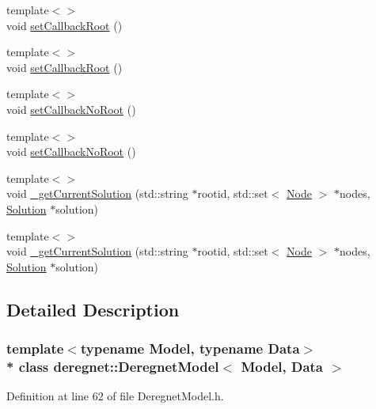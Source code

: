 \begin{DoxyCompactItemize}
\item 
{\footnotesize template$<$$>$ }\\void \hyperlink{classderegnet_1_1DeregnetModel_a8f10c7fabb80842cd27eb10d31289bbb}{set\+Callback\+Root} ()
\item 
{\footnotesize template$<$$>$ }\\void \hyperlink{classderegnet_1_1DeregnetModel_a1d62ef7fd28d6316d549712bf9214e54}{set\+Callback\+Root} ()
\item 
{\footnotesize template$<$$>$ }\\void \hyperlink{classderegnet_1_1DeregnetModel_a2aacf97af86f2c0f62b9fe4857443400}{set\+Callback\+No\+Root} ()
\item 
{\footnotesize template$<$$>$ }\\void \hyperlink{classderegnet_1_1DeregnetModel_a53356bbd16a9a2bfb51fcdf35da9cc7a}{set\+Callback\+No\+Root} ()
\item 
{\footnotesize template$<$$>$ }\\void \hyperlink{classderegnet_1_1DeregnetModel_ae031344d7bef7965ecbff1af301cc32b}{\+\_\+get\+Current\+Solution} (std\+::string $\ast$rootid, std\+::set$<$ \hyperlink{namespacederegnet_a744bad34f2de9856d36715a445f027f3}{Node} $>$ $\ast$nodes, \hyperlink{structderegnet_1_1Solution}{Solution} $\ast$solution)
\item 
{\footnotesize template$<$$>$ }\\void \hyperlink{classderegnet_1_1DeregnetModel_a38d98fe20d193181c7c5d0655f3c0808}{\+\_\+get\+Current\+Solution} (std\+::string $\ast$rootid, std\+::set$<$ \hyperlink{namespacederegnet_a744bad34f2de9856d36715a445f027f3}{Node} $>$ $\ast$nodes, \hyperlink{structderegnet_1_1Solution}{Solution} $\ast$solution)
\end{DoxyCompactItemize}


\subsection{Detailed Description}
\subsubsection*{template$<$typename Model, typename Data$>$\\*
class deregnet\+::\+Deregnet\+Model$<$ Model, Data $>$}



Definition at line 62 of file Deregnet\+Model.\+h.



